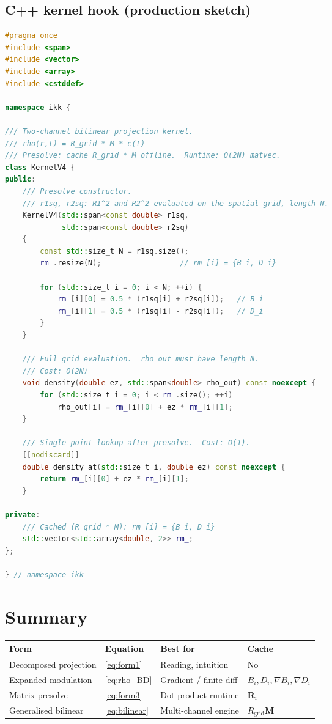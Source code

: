 \documentclass[11pt, a4paper, oneside]{article}
\newcommand{\Rgrid}{R_{\mathrm{grid}}}
\newcommand{\Mmat}{\mathbf{M}}
\begin{document}
\subsection{C++ kernel hook (production sketch)}

\begin{lstlisting}[language=C++, caption={Kernel V4 presolve hook (C++23)}]
#pragma once
#include <span>
#include <vector>
#include <array>
#include <cstddef>

namespace ikk {

/// Two-channel bilinear projection kernel.
/// rho(r,t) = R_grid * M * e(t)
/// Presolve: cache R_grid * M offline.  Runtime: O(2N) matvec.
class KernelV4 {
public:
	/// Presolve constructor.
	/// r1sq, r2sq: R1^2 and R2^2 evaluated on the spatial grid, length N.
	KernelV4(std::span<const double> r1sq,
			 std::span<const double> r2sq)
	{
		const std::size_t N = r1sq.size();
		rm_.resize(N);                  // rm_[i] = {B_i, D_i}

		for (std::size_t i = 0; i < N; ++i) {
			rm_[i][0] = 0.5 * (r1sq[i] + r2sq[i]);   // B_i
			rm_[i][1] = 0.5 * (r1sq[i] - r2sq[i]);   // D_i
		}
	}

	/// Full grid evaluation.  rho_out must have length N.
	/// Cost: O(2N)
	void density(double ez, std::span<double> rho_out) const noexcept {
		for (std::size_t i = 0; i < rm_.size(); ++i)
			rho_out[i] = rm_[i][0] + ez * rm_[i][1];
	}

	/// Single-point lookup after presolve.  Cost: O(1).
	[[nodiscard]]
	double density_at(std::size_t i, double ez) const noexcept {
		return rm_[i][0] + ez * rm_[i][1];
	}

private:
	/// Cached (R_grid * M): rm_[i] = {B_i, D_i}
	std::vector<std::array<double, 2>> rm_;
};

} // namespace ikk
\end{lstlisting}

\section{Summary}
\label{sec:summary}

\begin{center}
\begin{tabular}{llll}
  \toprule
  Form & Equation & Best for & Cache \\
  \midrule
  Decomposed projection  & \eqref{eq:form1}   & Reading, intuition        & No \\
  Expanded modulation    & \eqref{eq:rho_BD}  & Gradient / finite-diff    & $B_i, D_i, \nabla B_i, \nabla D_i$ \\
  Matrix presolve        & \eqref{eq:form3}   & Dot-product runtime       & $\mathbf{R}_i^\top$ \\
  Generalised bilinear   & \eqref{eq:bilinear}& Multi-channel engine      & $\Rgrid \Mmat$ \\
  \bottomrule
\end{tabular}
\end{center}
\end{document}

